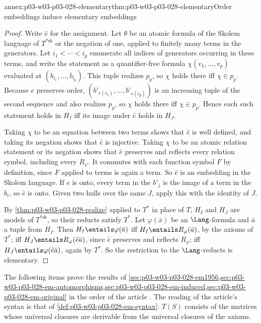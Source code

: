 \begin{annexitem}{annex:p03-w03-p03-028-elementary}{thm:p03-w03-p03-028-elementary}{Order embeddings induce elementary embeddings}
\begin{proof}
Write \(\hat e\) for the assignment.  Let \(\theta\) be an atomic
formula of the Skolem language of \(T^{*\mathrm{sk}}\) or the negation of
one, applied to finitely many terms in the generators.  Let
\(i_1<\cdots<i_p\) enumerate all indices of generators occurring in these
terms, and write the statement as a quantifier-free formula
\(\chi(v_1,\ldots,v_p)\) evaluated at \((b_{i_1},\ldots,b_{i_p})\).  This
tuple realizes \(p_p\), so \(\chi\) holds there iff \(\chi\in p_p\).
Because \(e\) preserves order, \((b'_{e(i_1)},\ldots,b'_{e(i_p)})\) is an
increasing tuple of the second sequence and also realizes \(p_p\), so
\(\chi\) holds there iff \(\chi\in p_p\).  Hence each such statement holds
in \(H_I\) iff its image under \(\hat e\) holds in \(H_J\).

Taking \(\chi\) to be an equation between two terms shows that \(\hat e\)
is well defined, and taking its negation shows that \(\hat e\) is
injective.  Taking \(\chi\) to be an atomic relation statement or its
negation shows that \(\hat e\) preserves and reflects every relation
symbol, including every \(R_\varphi\).  It commutes with each function
symbol \(F\) by definition, since \(F\) applied to terms is again a term.
So \(\hat e\) is an embedding in the Skolem language.  If \(e\) is onto,
every term in the \(b'_j\) is the image of a term in the \(b_i\), so
\(\hat e\) is onto.  Given two hulls over the same \(J\), apply this with
the identity of \(J\).

By \cref{thm:p03-w03-p03-028-realize} applied to \(T^*\) in place of
\(T\), \(H_I\) and \(H_J\) are models of \(T^{*\mathrm{sk}}\), so their
reducts satisfy \(T^*\).  Let \(\varphi(\bar x)\) be an
\(\Lang\)-formula and \(\bar a\) a tuple from \(H_I\).  Then
\(H_I\entails\varphi(\bar a)\) iff \(H_I\entails R_\varphi(\bar a)\), by
the axioms of \(T^*\); iff \(H_J\entails R_\varphi(\hat e\bar a)\), since
\(\hat e\) preserves and reflects \(R_\varphi\); iff
\(H_J\entails\varphi(\hat e\bar a)\), again by \(T^*\).  So the
restriction to the \(\Lang\)-reducts is elementary.
\end{proof}
\end{annexitem}

The following items prove the results of
\cref{sec:p03-w03-p03-028-em1956,sec:p03-w03-p03-028-em-automorphisms,sec:p03-w03-p03-028-em-induced,sec:p03-w03-p03-028-em-original}
in the order of the article \cite[pp.~51--68]{EhrenfeuchtMostowski1956}.  The
reading of the article's syntax is that of
\cref{def:p03-w03-p03-028-em-syntax}: \(T(S)\) consists of the matrices whose
universal closures are derivable from the universal closures of the axioms.

